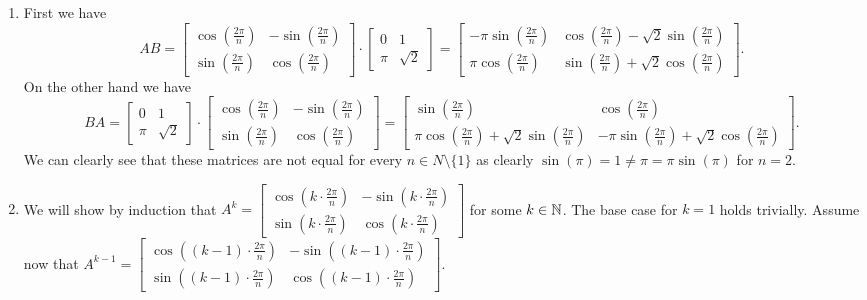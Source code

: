 \documentclass{article}
\begin{document}
\begin{solution}
  \begin{enumerate}[label=(\alph*)]
    \item First we have
      \[AB = \begin{bmatrix} \cos(\frac{2 \pi}{n}) & -\sin(\frac{2 \pi}{n})\\ \sin(\frac{2 \pi}{n}) & \cos(\frac{2 \pi}{n}) \end{bmatrix} \cdot \begin{bmatrix} 0 & 1\\ \pi & \sqrt{2} \end{bmatrix} = \begin{bmatrix} - \pi \sin(\frac{2 \pi}{n}) & \cos(\frac{2 \pi}{n}) - \sqrt{2} \sin(\frac{2 \pi}{n})\\ \pi \cos(\frac{2 \pi}{n}) & \sin(\frac{2 \pi}{n}) + \sqrt{2} \cos(\frac{2 \pi}{n}) \end{bmatrix}.\]
      On the other hand we have
      \[BA = \begin{bmatrix} 0 & 1\\ \pi & \sqrt{2} \end{bmatrix} \cdot \begin{bmatrix} \cos(\frac{2 \pi}{n}) & -\sin(\frac{2 \pi}{n})\\ \sin(\frac{2 \pi}{n}) & \cos(\frac{2 \pi}{n}) \end{bmatrix} = \begin{bmatrix} \sin(\frac{2 \pi}{n}) & \cos(\frac{2 \pi}{n})\\ \pi \cos(\frac{2 \pi}{n}) + \sqrt{2} \sin(\frac{2 \pi}{n}) & - \pi \sin(\frac{2 \pi}{n}) + \sqrt{2} \cos(\frac{2 \pi}{n}) \end{bmatrix}.\]
      We can clearly see that these matrices are not equal for every $n \in N \setminus \{1\}$ as clearly $\sin(\pi) = 1 \neq \pi = \pi \sin(\pi)$ for $n = 2$.
    \item We will show by induction that $A^k = \begin{bmatrix} \cos(k \cdot \frac{2 \pi}{n}) & -\sin(k \cdot \frac{2 \pi}{n})\\ \sin(k \cdot \frac{2 \pi}{n}) & \cos(k \cdot \frac{2 \pi}{n}) \end{bmatrix}$ for some $k \in \mathbb{N}$.
      The base case for $k = 1$ holds trivially.
      Assume now that $A^{k - 1} = \begin{bmatrix} \cos((k - 1) \cdot \frac{2 \pi}{n}) & -\sin((k - 1) \cdot \frac{2 \pi}{n})\\ \sin((k - 1) \cdot \frac{2 \pi}{n}) & \cos((k - 1) \cdot \frac{2 \pi}{n}) \end{bmatrix}$.

\end{enumerate}
\end{solution}
\end{document}
